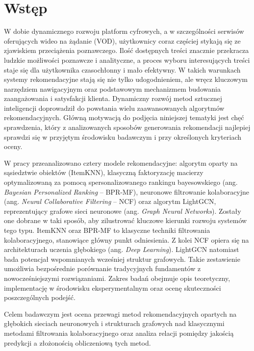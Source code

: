 \section*{Wstęp} 
W dobie dynamicznego rozwoju platform cyfrowych, a w szczególności serwisów oferujących wideo na żądanie (VOD), użytkownicy coraz częściej stykają się ze zjawiskiem przeciążenia poznawczego. Ilość dostępnych treści znacznie przekracza ludzkie możliwości poznawcze i analityczne, a proces wyboru interesujących treści staje się dla użytkownika czasochłonny i mało efektywny. W takich warunkach systemy rekomendacyjne stają się nie tylko udogodnieniem, ale wręcz kluczowym narzędziem nawigacyjnym oraz podstawowym mechanizmem budowania zaangażowania i satysfakcji klienta. Dynamiczny rozwój metod sztucznej inteligencji doprowadził do powstania wielu zaawansowanych algorytmów rekomendacyjnych. Główną motywacją do podjęcia niniejszej tematyki jest chęć sprawdzenia, który z analizowanych sposobów generowania rekomendacji najlepiej sprawdzi się w przyjętym środowisku badawczym i przy określonych kryteriach oceny.

W pracy przeanalizowano cztery modele rekomendacyjne: algorytm oparty na sąsiedztwie obiektów (ItemKNN), klasyczną faktoryzację macierzy optymalizowaną za pomocą spersonalizowanego rankingu bayesowskiego (ang. \foreignlanguage{english}{\textit{Bayesian Personalized Ranking}} -- BPR-MF), neuronowe filtrowanie kolaboracyjne (ang. \foreignlanguage{english}{\textit{Neural Collaborative Filtering}} -- NCF) oraz algorytm LightGCN, reprezentujący grafowe sieci neuronowe (ang. \foreignlanguage{english}{\textit{Graph Neural Networks}}). Zostały one dobrane w taki sposób, aby zilustrować kluczowe kierunki rozwoju systemów tego typu. ItemKNN oraz BPR-MF to klasyczne techniki filtrowania kolaboracyjnego, stanowiące główny punkt odniesienia. Z kolei NCF opiera się na architekturach uczenia głębokiego (ang. \foreignlanguage{english}{\textit{Deep Learning}}). LightGCN natomiast bada potencjał wspomnianych wcześniej struktur grafowych. Takie zestawienie umożliwia bezpośrednie porównanie tradycyjnych fundamentów z nowocześniejszymi rozwiązaniami. Zakres badań obejmuje opis teoretyczny, implementację w środowisku eksperymentalnym oraz ocenę skuteczności poszczególnych podejść.

Celem badawczym jest ocena przewagi metod rekomendacyjnych opartych na głębokich sieciach neuronowych i strukturach grafowych nad klasycznymi metodami filtrowania kolaboracyjnego oraz analiza relacji pomiędzy jakością predykcji a złożonością obliczeniową tych metod.

